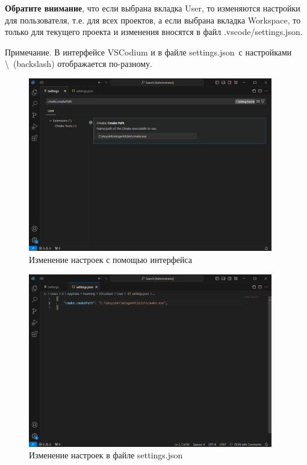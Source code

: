 \documentclass[a4paper,12pt]{article}
\begin{document}
\textbf{Обратите внимание}, что если выбрана вкладка User, то изменяются настройки для пользователя, т.е. для всех проектов, а если выбрана вкладка Workspace, то только для текущего проекта и изменения вносятся в файл \textquotedbl .vscode/settings.json\textquotedbl.

Примечание.
В интерфейсе VSCodium и в файле \textquotedbl settings.json\textquotedbl \ с настройками \textbackslash ~(backslash) отображается по-разному.

\begin{figure}[H]
	\centering
	\includegraphics[width=0.95\textwidth]{images/Settings_of_interface.png}
	\caption {Изменение настроек с помощью интерфейса}
	\label{fig:Settings_of_interface}
\end{figure}

\begin{figure}[H]
	\centering
	\includegraphics[width=0.95\textwidth]{images/Settings_of_json_file.png}
	\caption {Изменение настроек в файле \textquotedbl settings.json\textquotedbl}
	\label{fig:Settings_of_json_file}
\end{figure}
\end{document}
